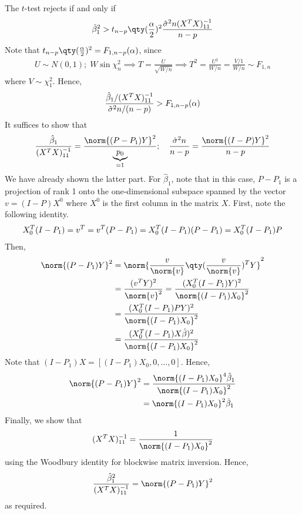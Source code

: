 The $t$-test rejects if and only if
\begin{align*}
	\hat \beta_1^2 > t_{n-p}\qty(\frac{\alpha}{2})^2 \frac{\hat\sigma^2 n (X^\tran X)^{-1}_{11}}{n-p}
\end{align*}
Note that $t_{n-p}\qty(\frac{\alpha}{2})^2 = F_{1,n-p}(\alpha)$, since
\begin{align*}
	U \sim N(0,1);\;W \sin \chi^2_n \implies T = \frac{U}{\sqrt{W/n}} \implies T^2 = \frac{U^2}{W/n} = \frac{V/1}{W/n} \sim F_{1,n}
\end{align*}
where $V \sim \chi^2_1$.
Hence,
\begin{align*}
	\frac{\hat \beta_1/(X^T X)^{-1}_{11}}{\hat\sigma^2 n/(n-p)} > F_{1,n-p}(\alpha)
\end{align*}
It suffices to show that
\begin{align*}
	\frac{\hat \beta_1}{(X^\tran X)^{-1}_{11}} = \frac{\norm{(P-P_1)Y}^2}{\underbrace{p_0}_{=1}};\quad \frac{\hat \sigma^2 n}{n-p} = \frac{\norm{(I-P)Y}^2}{n-p}
\end{align*}
We have already shown the latter part.
For $\hat \beta_1$, note that in this case, $P - P_1$ is a projection of rank 1 onto the one-dimensional subspace spanned by the vector $v = (I-P)X^0$ where $X^0$ is the first column in the matrix $X$.
First, note the following identity.
\begin{align*}
	X_0^T (I - P_1) = v^T = v^T (P-P_1) = X_0^T (I-P_1)(P-P_1) = X_0^T (I-P_1)P
\end{align*}
Then,
\begin{align*}
	\norm{(P-P_1)Y}^2 & = \norm{\frac{v}{\norm{v}} \qty(\frac{v}{\norm{v}})^\tran Y}^2                                 \\
	                  & = \frac{(v^\tran Y)^2}{\norm{v}^2} = \frac{(X_0^\tran (I-P_1) Y)^2}{\norm{(I-P_1) X_0}^2} \\
	                  & = \frac{(X_0^\tran (I-P_1) P Y)^2}{\norm{(I-P_1) X_0}^2}                                       \\
	                  & = \frac{(X_0^\tran (I-P_1) X \hat\beta)^2}{\norm{(I-P_1) X_0}^2}
\end{align*}
Note that $(I-P_1) X = [(I-P_1)X_0, 0, \dots, 0]$.
Hence,
\begin{align*}
	\norm{(P-P_1)Y}^2 & = \frac{\norm{(I-P_1)X_0}^4 \hat \beta_1}{\norm{(I-P_1)X_0}^2} \\
	                  & = \norm{(I-P_1)X_0}^2 \hat \beta_1
\end{align*}
Finally, we show that
\begin{align*}
	(X^\tran X)^{-1}_{11} = \frac{1}{\norm{(I-P_1)X_0}^2}
\end{align*}
using the Woodbury identity for blockwise matrix inversion.
Hence,
\begin{align*}
	\frac{\hat\beta_1^2}{(X^\tran X)^{-1}_{11}} = \norm{(P-P_1) Y}^2
\end{align*}
as required.

